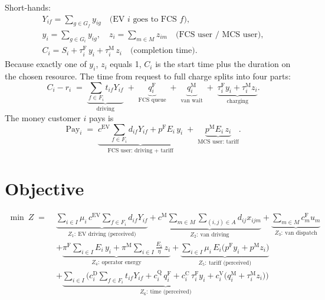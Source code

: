 \documentclass[12pt,a4paper]{article}
\begin{document}
Short-hands:
\begin{gather*}
Y_{if}=\sum_{g\in G_f}y_{ig}\quad\text{(EV $i$ goes to FCS $f$)},\\
y_i=\sum_{g\in G_i}y_{ig},\quad z_i=\sum_{m\in M}z_{im}\quad\text{(FCS user / MCS user)},\\
C_i=S_i+\tau^{\mathrm F}_i\,y_i+\tau^{\mathrm M}_i\,z_i\quad\text{(completion time)}.
\end{gather*}
Because exactly one of $y_i$, $z_i$ equals 1, $C_i$ is the start time plus the duration on the chosen resource. The time from request to full charge splits into four parts:
\[
C_i-r_i\;=\;\underbrace{\sum_{f\in F_i}t_{if}Y_{if}}_{\text{driving}}\;+\;\underbrace{q^{\mathrm F}_i}_{\text{FCS queue}}\;+\;\underbrace{q^{\mathrm M}_i}_{\text{van wait}}\;+\;\underbrace{\tau^{\mathrm F}_i y_i+\tau^{\mathrm M}_i z_i}_{\text{charging}}.
\]
The money customer $i$ pays is
\[
\text{Pay}_i\;=\;\underbrace{c^{\mathrm{EV}}\sum_{f\in F_i}d_{if}Y_{if}+p^{\mathrm F}E_i\,y_i}_{\text{FCS user: driving + tariff}}\;+\;\underbrace{p^{\mathrm M}E_i\,z_i}_{\text{MCS user: tariff}}.
\]

\section{Objective}

\begin{equation}
\begin{aligned}
\min\ Z \;=\;& \underbrace{\sum_{i\in I}\mu_i\,c^{\mathrm{EV}}\sum_{f\in F_i}d_{if}Y_{if}}_{Z_1:\ \text{EV driving (perceived)}}
+\underbrace{c^{\mathrm M}\sum_{m\in M}\sum_{(i,j)\in A}d_{ij}x_{ijm}}_{Z_2:\ \text{van driving}}
+\underbrace{\sum_{m\in M}c^{\mathrm F}_mu_m}_{Z_3:\ \text{van dispatch}}\\
&+\underbrace{\pi^{\mathrm F}\sum_{i\in I}E_i\,y_i+\pi^{\mathrm M}\sum_{i\in I}\frac{E_i}{\eta}\,z_i}_{Z_4:\ \text{operator energy}}
+\underbrace{\sum_{i\in I}\mu_i\,E_i\big(p^{\mathrm F}y_i+p^{\mathrm M}z_i\big)}_{Z_5:\ \text{tariff (perceived)}}\\
&+\underbrace{\sum_{i\in I}\Big(c^{\mathrm D}_i\sum_{f\in F_i}t_{if}Y_{if}+c^{\mathrm Q}_i\,q^{\mathrm F}_i+c^{\mathrm C}_i\,\tau^{\mathrm F}_iy_i+c^{\mathrm V}_i\big(q^{\mathrm M}_i+\tau^{\mathrm M}_iz_i\big)\Big)}_{Z_6:\ \text{time (perceived)}}
\end{aligned}\label{eq:obj}
\end{equation}
\end{document}
